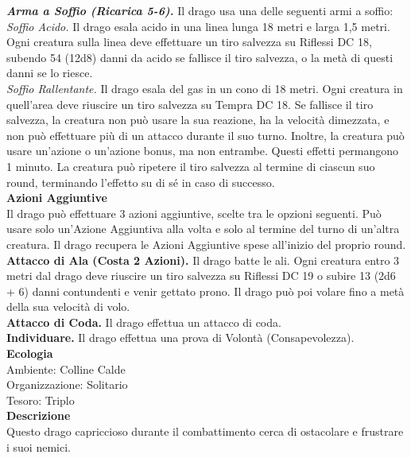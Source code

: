 \begin{multicols}{2}
\emph{\textbf{Arma a Soffio (Ricarica 5-6).}} Il drago usa una delle seguenti armi a soffio:\\
\emph{Soffio Acido.} Il drago esala acido in una linea lunga 18 metri e larga 1,5 metri. Ogni creatura sulla linea deve effettuare un tiro salvezza su Riflessi DC 18, subendo 54 (12d8) danni da acido se fallisce il tiro salvezza, o la metà di questi danni se lo riesce.\\
\emph{Soffio Rallentante.} Il drago esala del gas in un cono di 18 metri. Ogni creatura in quell'area deve riuscire un tiro salvezza su Tempra DC 18. Se fallisce il tiro salvezza, la creatura non può usare la sua reazione, ha la velocità dimezzata, e non può effettuare più di un attacco durante il suo turno. Inoltre, la creatura può usare un'azione o un'azione bonus, ma non entrambe. Questi effetti permangono 1 minuto. La creatura può ripetere il tiro salvezza al termine di ciascun suo round, terminando l'effetto su di sé in caso di successo.\\
\textbf{Azioni Aggiuntive}\\
Il drago può effettuare 3 azioni aggiuntive, scelte tra le opzioni seguenti. Può usare solo un'Azione Aggiuntiva alla volta e solo al termine del turno di un'altra creatura. Il drago recupera le Azioni Aggiuntive spese all'inizio del proprio round.\\
\textbf{Attacco di Ala (Costa 2 Azioni).} Il drago batte le ali. Ogni creatura entro 3 metri dal drago deve riuscire un tiro salvezza su Riflessi DC 19 o subire 13 (2d6 + 6) danni contundenti e venir gettato prono. Il drago può poi volare fino a metà della sua velocità di volo.\\
\textbf{Attacco di Coda.} Il drago effettua un attacco di coda.\\
\textbf{Individuare.} Il drago effettua una prova di Volontà (Consapevolezza).\\
\textbf{Ecologia}\\
Ambiente: Colline Calde\\
Organizzazione: Solitario\\
Tesoro: Triplo\\
\textbf{Descrizione}\\
Questo drago capriccioso durante il combattimento cerca di ostacolare e frustrare i suoi nemici.\\



\end{multicols}
